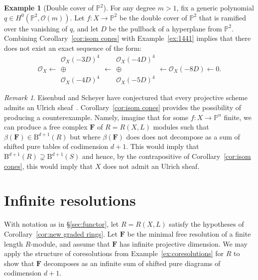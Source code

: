 \documentclass[12pt]{amsart}
\theoremstyle{definition}
\newtheorem{example}[lemma]{Example}
\theoremstyle{remark}
\newtheorem{remark}[lemma]{Remark}
\newcommand{\PP}{\mathbb{P}}
\newcommand{\cO}{\mathcal{O}}
\newcommand{\FF}{\mathbf{F}}
\newcommand{\BBQ}{\mathrm{B}}
\begin{document}
\begin{example}[Double cover of $\PP^2$]
For any degree $m>1$, fix a generic polynomial $q\in H^0(\PP^2, \cO(m))$.  Let $f\colon X\to\PP^2$ be the double cover of $\PP^2$ that is ramified over the vanishing of $q$, and let $D$ be the pullback of a hyperplane from $\PP^2$.  Combining Corollary~\ref{cor:isom cones} with Example~\ref{ex:1441} implies that there does not exist an exact sequence of the form:
\[
\cO_X\longleftarrow \begin{matrix}  \cO_X(-3D)^4\\ \oplus\\ \cO_X(-4D)^4\end{matrix}\longleftarrow \begin{matrix}  \cO_X(-4D)^4\\ \oplus\\ \cO_X(-5D)^4\end{matrix} \longleftarrow \cO_X(-8D)\longleftarrow 0.
\]
\end{example}


\begin{remark}
Eisenbud and Scheyer have conjectured that every projective scheme admits an Ulrich sheaf~\cite[p. 543]{eis-schrey-chow}.  Corollary~\ref{cor:isom cones} provides the possibility of producing a counterexample.  Namely, imagine that for some $f: X\to \PP^n$ finite, we can produce a free complex $\FF$ of $R=R(X,L)$ modules such that $\beta(\FF)\in \BBQ^{d+1}(R)$ but where $\beta(\FF)$ does does not decompose as a sum of shifted pure tables of codimension $d+1$.  This would imply that $\BBQ^{d+1}(R)\supsetneq \BBQ^{d+1}(S)$ and hence, by the contrapositive of Corollary~\ref{cor:isom cones}, this would imply that $X$ does not admit an Ulrich sheaf.
\end{remark}


\section{Infinite resolutions}\label{sec:infinite}
With notation as in \S\ref{sec:functor}, let $R=R(X,L)$ satisfy the hypotheses of Corollary~\ref{cor:new graded rings}.  Let $\FF$ be the minimal free resolution of a finite length $R$-module, and assume that $\FF$ has infinite projective dimension.  We may apply the structure of coresolutions from Example~\ref{ex:coresolutions} for $R$ to show that $\FF$ decomposes as an infinite sum of shifted pure diagrams of codimension $d+1$.
\end{document}
